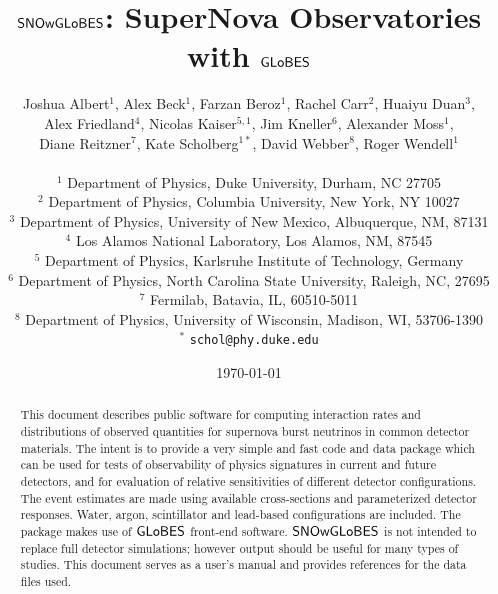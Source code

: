 \documentclass[12pt]{article}
\newcommand{\globes}{\sf{GLoBES}}
\newcommand{\snowglobes}{\sf{SNOwGLoBES}}
\begin{document}
\title{\bf $\snowglobes$: SuperNova Observatories with $\globes$}
\author{Joshua Albert$^1$,
Alex Beck$^1$,
Farzan Beroz$^1$,
Rachel Carr$^2$,
Huaiyu Duan$^3$,\\
Alex Friedland$^4$,
Nicolas Kaiser$^{5,1}$,
Jim Kneller$^6$,
Alexander Moss$^1$,\\
Diane Reitzner$^7$,
Kate Scholberg$^{1*}$,
David Webber$^8$,
Roger Wendell$^1$\\
~\\
\small
$^1$ Department of Physics, Duke University, Durham, NC 27705\\
\small
$^2$ Department of Physics, Columbia University, New York, NY 10027\\
\small
$^3$ Department of Physics, University of New Mexico, Albuquerque, NM, 87131\\
\small
$^4$ Los Alamos National Laboratory, Los Alamos, NM, 87545\\
\small
$^5$ Department of Physics, Karlsruhe Institute of Technology, Germany\\
\small
$^6$ Department of Physics, North Carolina State University, Raleigh, NC,  27695\\
\small
$^7$ Fermilab, Batavia, IL, 60510-5011\\
\small
$^8$ Department of Physics, University of Wisconsin, Madison, WI, 53706-1390\\
\small
$^*$ \texttt{schol@phy.duke.edu}\\
}

\date{\today}

\maketitle


\begin{abstract}
This document describes public software
  for computing interaction rates and distributions of observed
  quantities for supernova burst neutrinos in common detector
  materials.  The intent is to provide a very simple and fast
  code and data
  package which
  can be used for tests of observability of physics signatures in
  current and future detectors, and for evaluation of relative
  sensitivities of different detector configurations.  The event
  estimates are made using available cross-sections and
  parameterized detector responses.  Water, argon, scintillator
  and lead-based configurations are included.
  The package makes use of $\globes$
  front-end software.  $\snowglobes$ is not intended to replace full
  detector simulations; however output should be useful for many types
  of studies.  This document serves as a user's manual and provides
  references for the data files used.

\end{abstract}
\end{document}
